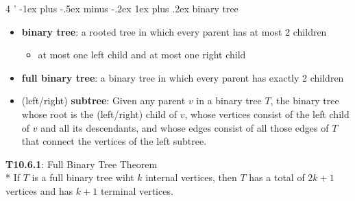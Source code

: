 \documentclass[10pt, landscape]{article}
\makeatletter
\renewcommand{\subsubsection}{\@startsection{subsubsection}{3}{0mm}%
                                {-1ex plus -.5ex minus -.2ex}%
                                {1ex plus .2ex}%
                                {\normalfont\small\bfseries}}%
\makeatother
\begin{document}
\begin{multicols}{4
    '}
\subsubsection{binary tree}
\begin{itemize}
    \item \textbf{binary tree}: a rooted tree in which every parent has at most 2 children
    \begin{itemize}
        \item at most one left child and at most one right child
    \end{itemize}
    \item \textbf{full binary tree}: a binary tree in which every parent has exactly 2 children
    \item (left/right) \textbf{subtree}: Given any parent $v$ in a binary tree $T$, 
        the binary tree whose root is the (left/right) child of $v$, whose vertices consist of the left child of $v$ and all its descendants, 
        and whose edges consist of all those edges of $T$ that connect the vertices of the left subtree.
\end{itemize}
\begin{center}
    \textbf{T10.6.1}: Full Binary Tree Theorem
    \\* If $T$ is a full binary tree wiht $k$ internal vertices, then $T$ has a total of $2k + 1$ vertices and has $k+1$ terminal vertices.
\end{center}


\end{multicols}
\end{document}
